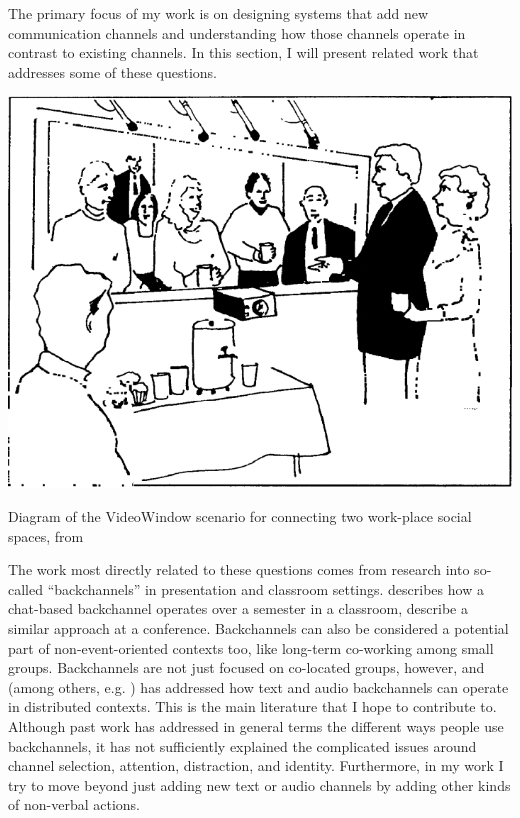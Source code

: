 \documentclass{tufte-handout}
\begin{document}
The primary focus of my work is on designing systems that add new communication channels and understanding how those channels operate in contrast to existing channels. In this section, I will present related work that addresses some of these questions.

\begin{marginfigure}
	\includegraphics{figures/videowindow.png}
	\caption{Diagram of the VideoWindow scenario for connecting two work-place social spaces, from \citep{Fish:1990fn}}
	\label{fig:videowindow}
\end{marginfigure}

The work most directly related to these questions comes from research into so-called ``backchannels'' in presentation and classroom settings. \citet{Yardi:2006uk} describes how a chat-based backchannel operates over a semester in a classroom, \citet{mccarthy_digital_2004} describe a similar approach at a conference. Backchannels can also be considered a potential part of non-event-oriented contexts too, like long-term co-working among small groups. \citep{Huang:2003ef} Backchannels are not just focused on co-located groups, however, and \citet{kellogg_leveraging_2006} (among others, e.g.  \citep{Yankelovich:2005bx}) has addressed how text and audio backchannels can operate in distributed contexts. This is the main literature that I hope to contribute to. Although past work has addressed in general terms the different ways people use backchannels, it has not sufficiently explained the complicated issues around channel selection, attention, distraction, and identity. Furthermore, in my work I try to move beyond just adding new text or audio channels by adding other kinds of non-verbal actions.
\end{document}
